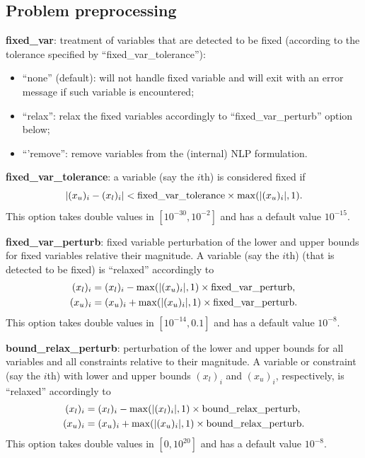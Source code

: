 \documentclass[11pt]{article}
\begin{document}
\medskip

\subsection{Problem preprocessing}


\noindent \textbf{fixed\_var}: treatment of  variables that are detected to be fixed (according to the tolerance specified by ``fixed\_var\_tolerance''):
\begin{itemize}
\item ``none'' (default): will not handle fixed variable and will exit with an error message if such variable is encountered;
\item ``relax'':  relax the fixed variables accordingly to ``fixed\_var\_perturb'' option below;
\item ``'remove'': remove variables from the (internal) NLP formulation.
\end{itemize}

\medskip

\noindent \textbf{fixed\_var\_tolerance}: a variable (say the $i$th) is considered fixed if 
\begin{displaymath}
|(x_u)_i-(x_l)_i| < \textnormal{fixed\_var\_tolerance} \times \max(|(x_u)_i|,1).
\end{displaymath}
This option takes double values in $[10^{-30}, 10^{-2}]$ and has a default value $10^{-15}$.

\medskip

\noindent \textbf{fixed\_var\_perturb}: fixed variable perturbation of the lower and upper bounds for fixed variables relative their  magnitude. A variable (say the $i$th) (that is detected to be fixed) is ``relaxed'' accordingly to 
\begin{align*}
(x_l)_i & =  (x_l)_i -  \max(|(x_u)_i|,1) \times \textnormal{fixed\_var\_perturb}, \\
(x_u)_i & =  (x_u)_i +  \max(|(x_u)_i|,1) \times \textnormal{fixed\_var\_perturb}.
\end{align*}
This option takes double values in $[10^{-14}, 0.1]$ and has a default value $10^{-8}$.


\noindent \textbf{bound\_relax\_perturb}: perturbation of the lower and upper bounds for all variables and all constraints relative to their magnitude. A variable or constraint (say the $i$th) with lower and upper bounds $(x_l)_i$ and $(x_u)_i$, respectively,  is ``relaxed'' accordingly to 
\begin{align*}
(x_l)_i & =  (x_l)_i -  \max(|(x_l)_i|,1) \times \textnormal{bound\_relax\_perturb}, \\
(x_u)_i & =  (x_u)_i +  \max(|(x_u)_i|,1) \times \textnormal{bound\_relax\_perturb}.
\end{align*}
This option takes double values in $[0, 10^{20}]$ and has a default value $10^{-8}$.
\end{document}
